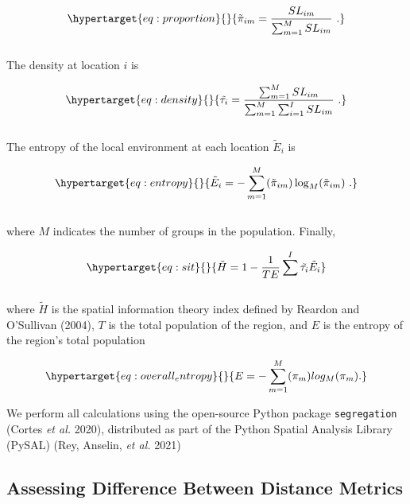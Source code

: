 \documentclass[
  10pt,
]{article}
\begin{document}
\begin{equation}\protect\hypertarget{eq:proportion}{}{
\tilde{\pi}_{im} = \frac{SL_{im}}{\sum^M_{m=1}{SL_{im}}} \ .
}\label{eq:proportion}\end{equation}\\
The density at location \(i\) is

\begin{equation}\protect\hypertarget{eq:density}{}{
\tilde{\tau_i} = \frac{\sum^M_{m=1}{SL_{im}}}{\sum^M_{m=1}\sum^I_{i=1}{SL_{im}}} \ .
}\label{eq:density}\end{equation}\\
The entropy of the local environment at each location \(\tilde{E}_i\) is

\begin{equation}\protect\hypertarget{eq:entropy}{}{
\tilde{E}_i = -\sum^M_{m=1}(\tilde{\pi}_{im})\log_M(\tilde{\pi}_{im}) \ .
}\label{eq:entropy}\end{equation}\\
where \(M\) indicates the number of groups in the population. Finally,

\begin{equation}\protect\hypertarget{eq:sit}{}{
\tilde{H} = 1-\frac{1}{TE} \sum^I \tilde{\tau_i}\tilde{E}_i
}\label{eq:sit}\end{equation}\\
where \(\tilde{H}\) is the spatial information theory index defined by
Reardon and O'Sullivan (2004), \(T\) is the total population of the
region, and \(E\) is the entropy of the region's total population

\begin{equation}\protect\hypertarget{eq:overall_entropy}{}{
E = -\sum^M_{m=1}(\pi_m)log_M(\pi_m).
}\label{eq:overall_entropy}\end{equation}

We perform all calculations using the open-source Python package
\texttt{segregation} (Cortes \emph{et al.} 2020), distributed as part of
the Python Spatial Analysis Library (PySAL) (Rey, Anselin, \emph{et al.}
2021)

\hypertarget{assessing-difference-between-distance-metrics}{%
\subsection{Assessing Difference Between Distance
Metrics}\label{assessing-difference-between-distance-metrics}}
\end{document}
